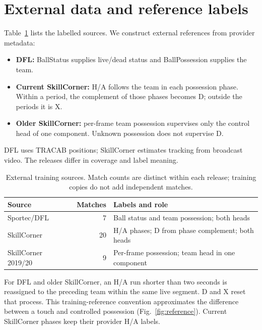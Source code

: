 \documentclass[conference,a4paper]{IEEEtran}
\begin{document}
\section{External data and reference labels}
Table~\ref{tab:data} lists the labelled sources. We construct external references
from provider metadata:
\begin{itemize}
\item \textbf{DFL:} BallStatus supplies live/dead status and BallPossession supplies
the team.
\item \textbf{Current SkillCorner:} H/A follows the team in each possession phase.
Within a period, the complement of those phases becomes D; outside the periods
it is X.
\item \textbf{Older SkillCorner:} per-frame team possession supervises only the
control head of one component. Unknown possession does not supervise D.
\end{itemize}
DFL uses TRACAB positions; SkillCorner estimates tracking from broadcast video.
The releases differ in coverage and label meaning.

\begin{table}[t]
\caption{External training sources. Match counts are distinct within each release;
training copies do not add independent matches.}
\label{tab:data}
\centering\small
\begin{tabular}{@{}p{}rp{}@{}}
\toprule
Source & Matches & Labels and role \\
\midrule
{\raggedright Sportec/DFL~\cite{bassek2025}\par} & 7 & {\raggedright Ball status and team possession; both heads\par} \\
{\raggedright SkillCorner~\cite{skillcorner}\par} & 20 & {\raggedright H/A phases; D from phase complement; both heads\par} \\
{\raggedright SkillCorner 2019/20~\cite{skillcornerlegacy}\par} & 9 & {\raggedright Per-frame possession; team head in one component\par} \\
\bottomrule
\end{tabular}
\end{table}

For DFL and older SkillCorner, an H/A run shorter than two seconds is reassigned
to the preceding team within the same live segment. D and X reset that process.
This training-reference convention approximates the difference between a touch
and controlled possession (Fig.~\ref{fig:reference}). Current SkillCorner phases
keep their provider H/A labels.
\end{document}
